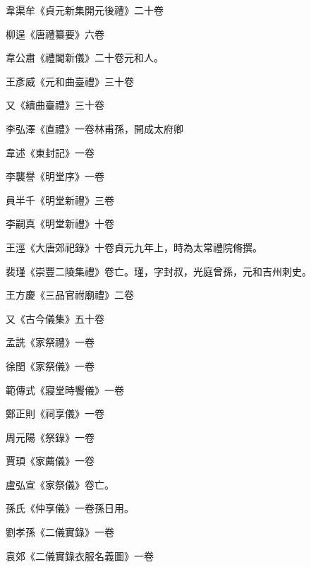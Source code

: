 \begin{pinyinscope}
 韋渠牟《貞元新集開元後禮》二十卷



 柳逞《唐禮纂要》六卷



 韋公肅《禮閣新儀》二十卷元和人。



 王彥威《元和曲臺禮》三十卷



 又《續曲臺禮》三十卷



 李弘澤《直禮》一卷林甫孫，開成太府卿



 韋述《東封記》一卷



 李襲譽《明堂序》一卷



 員半千《明堂新禮》三卷



 李嗣真《明堂新禮》十卷



 王涇《大唐郊祀錄》十卷貞元九年上，時為太常禮院脩撰。



 裴瑾《崇豐二陵集禮》卷亡。瑾，字封叔，光庭曾孫，元和吉州刺史。



 王方慶《三品官祔廟禮》二卷



 又《古今儀集》五十卷



 孟詵《家祭禮》一卷



 徐閏《家祭儀》一卷



 範傳式《寢堂時饗儀》一卷



 鄭正則《祠享儀》一卷



 周元陽《祭錄》一卷



 賈頊《家薦儀》一卷



 盧弘宣《家祭儀》卷亡。



 孫氏《仲享儀》一卷孫日用。



 劉孝孫《二儀實錄》一卷



 袁郊《二儀實錄衣服名義圖》一卷




\end{pinyinscope}
